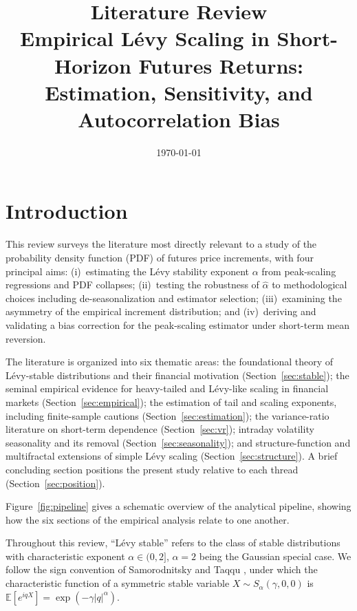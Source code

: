 \documentclass[12pt,a4paper]{article}
\title{\textbf{Literature Review}\\[0.4em]
       \large Empirical Lévy Scaling in Short-Horizon Futures Returns:\\
       Estimation, Sensitivity, and Autocorrelation Bias}
\date{\today}
\begin{document}
\maketitle
\tableofcontents
\newpage

\section{Introduction}

This review surveys the literature most directly relevant to a study of the
probability density function (PDF) of futures price increments, with four
principal aims: (i)~estimating the Lévy stability exponent $\alpha$ from
peak-scaling regressions and PDF collapses; (ii)~testing the robustness of
$\hat\alpha$ to methodological choices including de-seasonalization and
estimator selection; (iii)~examining the asymmetry of the empirical increment
distribution; and (iv)~deriving and validating a bias correction for the
peak-scaling estimator under short-term mean reversion.

The literature is organized into six thematic areas: the foundational theory
of Lévy-stable distributions and their financial motivation
(Section~\ref{sec:stable}); the seminal empirical evidence for heavy-tailed
and Lévy-like scaling in financial markets (Section~\ref{sec:empirical});
the estimation of tail and scaling exponents, including finite-sample cautions
(Section~\ref{sec:estimation}); the variance-ratio literature on short-term
dependence (Section~\ref{sec:vr}); intraday volatility seasonality and its
removal (Section~\ref{sec:seasonality}); and structure-function and
multifractal extensions of simple Lévy scaling (Section~\ref{sec:structure}).
A brief concluding section positions the present study relative to each thread
(Section~\ref{sec:position}).

Figure~\ref{fig:pipeline} gives a schematic overview of the analytical
pipeline, showing how the six sections of the empirical analysis relate to
one another.

Throughout this review, ``Lévy stable'' refers to the class of stable
distributions with characteristic exponent $\alpha \in (0,2]$, $\alpha = 2$
being the Gaussian special case. We follow the sign convention of
Samorodnitsky and Taqqu \cite{SamorodTaqqu1994}, under which the characteristic function of a
symmetric stable variable $X \sim S_\alpha(\gamma,0,0)$ is
$\mathbb{E}[e^{iqX}] = \exp(-\gamma|q|^\alpha)$.
\end{document}
